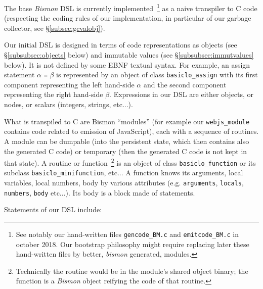The base \emph{Bismon} DSL is currently implemented~\footnote{See
  notably our hand-written files \texttt{gencode\_BM.c} and
  \texttt{emitcode\_BM.c} in october 2018. Our bootstrap philosophy
  might require replacing later these hand-written files by better,
  \emph{bismon} generated, modules.} as a naive transpiler to C code
(respecting the coding rules of our implementation, in particular of
our garbage collector, see §\ref{subsec:gcvalobj}).

Our initial DSL is designed in terms of code representations as
objects (see §\ref{subsubsec:objects} below) and immutable values (see
§\ref{subsubsec:immutvalues} below). It is not defined by some EBNF
textual syntax. For example, an assign statement $\alpha$ \texttt{=} $\beta$
is represented by an object of class \texttt{basiclo\_assign} with its
first component representing the left hand-side $\alpha$ and the
second component representing the right hand-side $\beta$. Expressions
in our DSL are either objects, or nodes, or scalars (integers,
strings, etc...).


What is transpiled to C are Bismon ``modules'' (for example our
\texttt{webjs\_module} contains code related to emission of
JavaScript), each with a sequence of routines. A module can be
dumpable (into the persistent state, which then contains also the
generated C code) or temporary (then the generated C code is not kept
in that state). A routine or function~\footnote{Technically the
  routine would be in the module's shared object binary; the function
  is a \emph{Bismon} object reifying the code of that routine.}  is an
object of class \texttt{basiclo\_function} or its subclass
\texttt{basiclo\_minifunction}, etc... A function knows its arguments,
local variables, local numbers, body by various attributes
(e.g. \texttt{arguments}, \texttt{locals}, \texttt{numbers},
\texttt{body} etc...). Its body is a block made of statements.

Statements of our DSL include:

